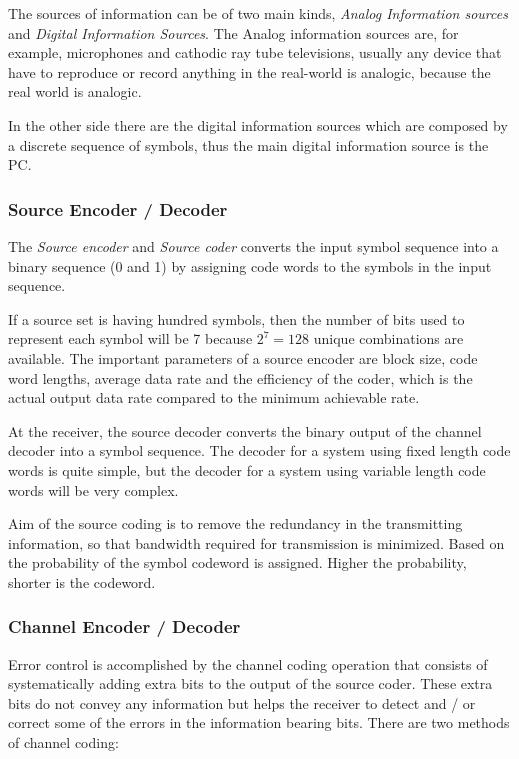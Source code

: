 The sources of information can be of two main kinds, \emph{Analog Information
sources} and \emph{Digital Information Sources}. The Analog information sources
are, for example, microphones and cathodic ray tube televisions, usually any
device that have to reproduce or record anything in the real-world is analogic,
because the real world is analogic.

In the other side there are the digital information sources which are composed
by a discrete sequence of symbols, thus the main digital information source is
the PC.

\subsubsection{Source Encoder / Decoder}

The \emph{Source encoder}  and \emph{Source coder} converts the input symbol
sequence into a binary sequence (0 and 1) by assigning code words to the symbols
in the input sequence.

If a source set is having hundred symbols, then the number of bits used to
represent each symbol will be 7 because $2^7=128$ unique combinations are
available. The important parameters of a source encoder are block size, code
word lengths, average data rate and the efficiency of the coder, which is the
actual output data rate compared to the minimum achievable rate.

At the receiver, the source decoder converts the binary output of the channel
decoder into a symbol sequence. The decoder for a system using fixed length code
words is quite simple, but the decoder for a system using variable length code
words will be very complex.

Aim of the source coding is to remove the redundancy in the transmitting
information, so that bandwidth required for transmission is minimized. Based on
the probability of the symbol codeword is assigned. Higher the probability,
shorter is the codeword.

\subsubsection{Channel Encoder / Decoder}

Error control is accomplished by the channel coding operation that consists of
systematically adding extra bits to the output of the source coder. These extra
bits do not convey any information but helps the receiver to detect and / or
correct some of the errors in the information bearing bits. There are two
methods of channel coding:

